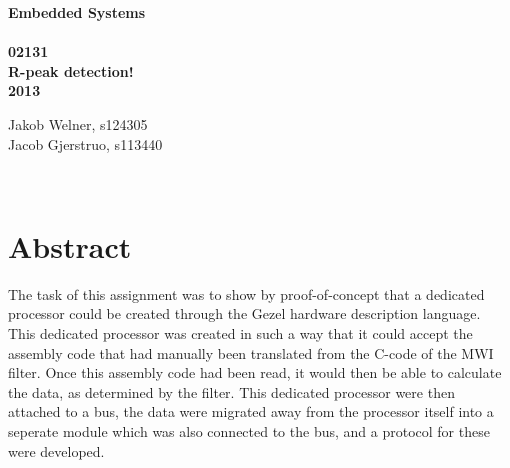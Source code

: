 \documentclass[12pt,a4paper]{article}
\begin{document}
\begin{titlepage}
	\begin{center}
		\vspace*{13\baselineskip}
		\huge
		\bfseries
		Embedded Systems\\ 
		\ \\
		02131 \\[5\baselineskip]

		\normalfont
		\Large
		R-peak detection!\\	
		2013

		\small
		\vfill
	\end{center}	
	\begin{flushleft}
		Jakob Welner, s124305\\
	 	Jacob Gjerstruo, s113440\\
	\end{flushleft}
\end{titlepage}

\ \\
\section*{Abstract}
The task of this assignment was to show by proof-of-concept that a dedicated processor could be created through the Gezel hardware description language. This dedicated processor was created in such a way that it could accept the assembly code that had manually been translated from the C-code of the MWI filter. Once this assembly code had been read, it would then be able to calculate the data, as determined by the filter. This dedicated processor were then attached to a bus, the data were migrated away from the processor itself into a seperate module which was also connected to the bus, and a protocol for these were developed.

\thispagestyle{empty} 
\newpage

\tableofcontents
\thispagestyle{empty} 
\newpage

\setcounter{page}{1}

\ \\
\end{document}
